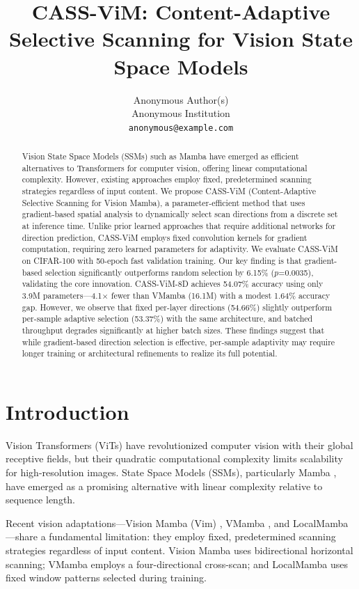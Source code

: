\documentclass{article}
\title{CASS-ViM: Content-Adaptive Selective Scanning for Vision State Space Models}
\author{%
  Anonymous Author(s)\\
  Anonymous Institution\\
  \texttt{anonymous@example.com}
}
\begin{document}
\maketitle

\begin{abstract}
Vision State Space Models (SSMs) such as Mamba have emerged as efficient alternatives to Transformers for computer vision, offering linear computational complexity. However, existing approaches employ fixed, predetermined scanning strategies regardless of input content. We propose CASS-ViM (Content-Adaptive Selective Scanning for Vision Mamba), a parameter-efficient method that uses gradient-based spatial analysis to dynamically select scan directions from a discrete set at inference time. Unlike prior learned approaches that require additional networks for direction prediction, CASS-ViM employs fixed convolution kernels for gradient computation, requiring zero learned parameters for adaptivity. We evaluate CASS-ViM on CIFAR-100 with 50-epoch fast validation training. Our key finding is that gradient-based selection significantly outperforms random selection by 6.15\% ($p$=0.0035), validating the core innovation. CASS-ViM-8D achieves 54.07\% accuracy using only 3.9M parameters---4.1$\times$ fewer than VMamba (16.1M) with a modest 1.64\% accuracy gap. However, we observe that fixed per-layer directions (54.66\%) slightly outperform per-sample adaptive selection (53.37\%) with the same architecture, and batched throughput degrades significantly at higher batch sizes. These findings suggest that while gradient-based direction selection is effective, per-sample adaptivity may require longer training or architectural refinements to realize its full potential.
\end{abstract}

\section{Introduction}
\label{sec:introduction}

Vision Transformers (ViTs) have revolutionized computer vision with their global receptive fields, but their quadratic computational complexity limits scalability for high-resolution images. State Space Models (SSMs), particularly Mamba \cite{gu2023mamba}, have emerged as a promising alternative with linear complexity relative to sequence length.

Recent vision adaptations---Vision Mamba (Vim) \cite{zhu2024vision}, VMamba \cite{liu2024vmamba}, and LocalMamba \cite{huang2024localmamba}---share a fundamental limitation: they employ fixed, predetermined scanning strategies regardless of input content. Vision Mamba uses bidirectional horizontal scanning; VMamba employs a four-directional cross-scan; and LocalMamba uses fixed window patterns selected during training.
\end{document}
